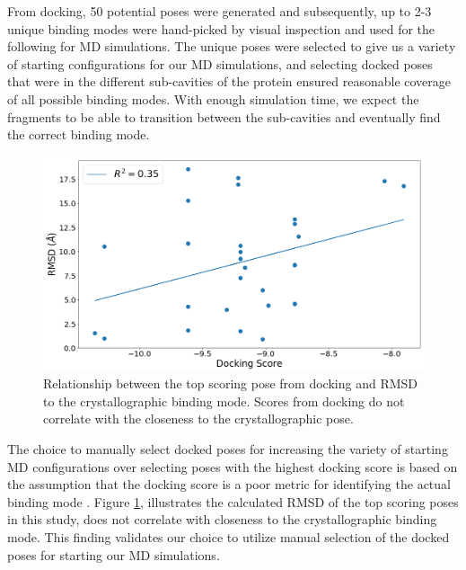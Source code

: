 From docking, 50 potential poses were generated and subsequently, up to 2-3 unique binding modes were hand-picked by visual inspection and used for the following for MD simulations.
The unique poses were selected to give us a variety of starting configurations for our MD simulations, and selecting docked poses that were in the different sub-cavities of the protein ensured reasonable coverage of all possible binding modes.
With enough simulation time, we expect the fragments to be able to transition between the sub-cavities and eventually find the correct binding mode.

\begin{figure}
    \centering
    \includegraphics[width=\linewidth]{chapter5/Figures/topscore-rmsd.png}
    \caption[RMSD of Top Scoring Docked Poses]{Relationship between the top scoring pose from docking and RMSD to the crystallographic binding mode. Scores from docking do not correlate with the closeness to the crystallographic pose.}
    \label{fig:topscore_correlation}
\end{figure}

The choice to manually select docked poses for increasing the variety of starting MD configurations over selecting poses with the highest docking score is based on the assumption that the docking score is a poor metric for identifying the actual binding mode \cite{warren_critical_2006}.
Figure \ref{fig:topscore_correlation}, illustrates the calculated RMSD of the top scoring poses in this study, does not correlate with closeness to the crystallographic binding mode.
This finding validates our choice to utilize manual selection of the docked poses for starting our MD simulations.

